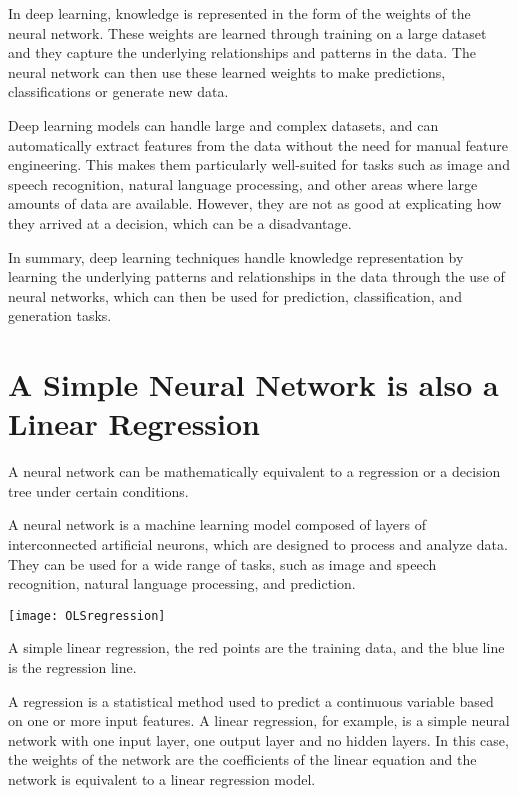 In deep learning, knowledge is represented in the form of the weights of the neural network. These weights are learned through training on a large dataset and they capture the underlying relationships and patterns in the data. The neural network can then use these learned weights to make predictions, classifications or generate new data.

Deep learning models can handle large and complex datasets, and can automatically extract features from the data without the need for manual feature engineering. This makes them particularly well-suited for tasks such as image and speech recognition, natural language processing, and other areas where large amounts of data are available. However, they are not as good at explicating how they arrived at a decision, which can be a disadvantage.

In summary, deep learning techniques handle knowledge representation by learning the underlying patterns and relationships in the data through the use of neural networks, which can then be used for prediction, classification, and generation tasks.

\section{A Simple Neural Network is also a Linear Regression}

A neural network can be mathematically equivalent to a regression or a decision tree under certain conditions.

A neural network is a machine learning model composed of layers of interconnected artificial neurons, which are designed to process and analyze data. They can be used for a wide range of tasks, such as image and speech recognition, natural language processing, and prediction.

\begin{marginfigure}[-5.5cm]
	\texttt{[image: OLSregression]}
        \caption{A simple linear regression, the red points are the training data, and the blue line is the regression line.}
\end{marginfigure}


A regression is a statistical method used to predict a continuous variable based on one or more input features. A linear regression, for example, is a simple neural network with one input layer, one output layer and no hidden layers. In this case, the weights of the network are the coefficients of the linear equation and the network is equivalent to a linear regression model.

